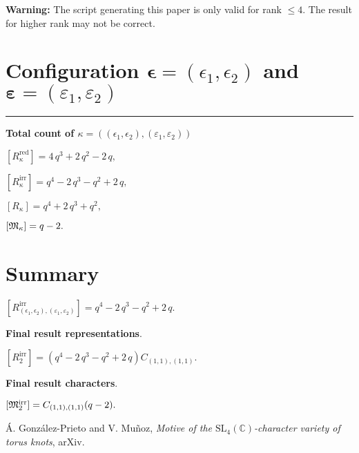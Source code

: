 \documentclass[10pt,a4paper]{amsart}
\begin{document}
\textbf{Warning: }The script generating this paper is only valid for rank $\leq 4$. The result for higher rank may not be correct.

\newpage{}


\section{Configuration $\bm{\epsilon} = (\epsilon_1,\epsilon_2)$ and $\bm{\varepsilon} =(\varepsilon_1,\varepsilon_2)$}
\noindent\rule{9cm}{2pt}\vspace{0.2cm}

\noindent\textbf{Total count of $\kappa = ((\epsilon_1,\epsilon_2), (\varepsilon_1,\varepsilon_2))$}\medskip

${[R_{\kappa}^{\textrm{red}}]} = 4 \, q^{3} + 2 \, q^{2} - 2 \, q ,$

${[R_{\kappa}^{\textrm{irr}}]} = q^{4} - 2 \, q^{3} - q^{2} + 2 \, q ,$

${[R_{\kappa}]} = q^{4} + 2 \, q^{3} + q^{2} ,$

${[{\frak M}_{\kappa}]} = q - 2 .$

\newpage{}

\section*{Summary}
$[R_{(\epsilon_1,\epsilon_2),(\varepsilon_1,\varepsilon_2)}^{\textrm{irr}}] = q^{4} - 2 \, q^{3} - q^{2} + 2 \, q .$


\medskip\textbf{Final result representations}.\medskip

$[R_{2}^{\textrm{irr}}] = (q^{4} - 2 \, q^{3} - q^{2} + 2 \, q) {C_{(1, 1), (1, 1)}}.$

\medskip\textbf{Final result characters}.\medskip

$[{\frak M}_{2}^{\textrm{irr}}] = {C_{(1, 1), (1, 1)}} (q - 2).$

\begin{thebibliography}{11}

\'A. Gonz\'alez-Prieto and V. Mu\~noz, \emph{Motive of the $\mathrm{SL}_4(\mathbb{C})$-character variety of torus knots}, arXiv.
\end{thebibliography}
\end{document}
